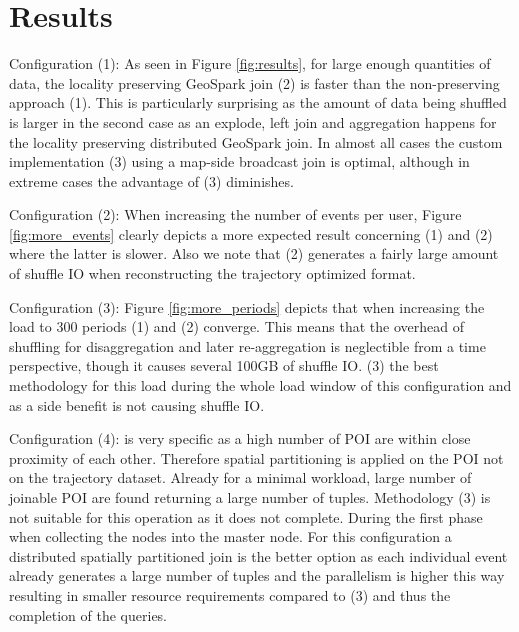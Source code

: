 \documentclass[conference]{IEEEtran}
\begin{document}
\section{Results}
Configuration (1): As seen in Figure \ref{fig:results}, for large enough quantities of data, the locality preserving GeoSpark join (2) is faster than the non-preserving approach (1).
This is particularly surprising as the amount of data being shuffled is larger in the second case as an explode, left join and aggregation happens for the locality preserving distributed GeoSpark join.
In almost all cases the custom implementation (3) using a map-side broadcast join is optimal,
although in extreme cases the advantage of (3) diminishes.

Configuration (2): When increasing the number of events per user, Figure \ref{fig:more_events} clearly depicts a more expected result concerning (1) and (2) where the latter is slower.
Also we note that (2) generates a fairly large amount of shuffle IO when reconstructing the trajectory optimized format.

Configuration (3): Figure \ref{fig:more_periods} depicts that when increasing the load to 300 periods (1) and (2) converge.
This means that the overhead of shuffling for disaggregation and later re-aggregation is neglectible from a time perspective, though it causes several 100GB of shuffle IO.
(3) the best methodology for this load during the whole load window of this configuration and as a side benefit is not causing shuffle IO.

Configuration (4): is very specific as a high number of POI are within close proximity of each other.
Therefore spatial partitioning is applied on the POI not on the trajectory dataset.
Already for a minimal workload, large number of joinable POI are found returning a large number of tuples.
Methodology (3) is not suitable for this operation as it does not complete. During the first phase when collecting the nodes into the master node.
For this configuration a distributed spatially partitioned join is the
better option as each individual event already generates a large number of tuples and the parallelism is higher this way resulting in smaller resource requirements compared to (3) and thus the completion of the queries.
\end{document}
